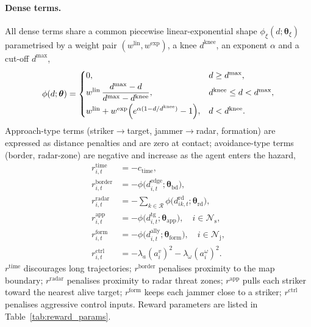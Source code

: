 \paragraph{Dense terms.}
All dense terms share a common piecewise linear-exponential shape
$\phi_\xi(d;\boldsymbol{\theta}_\xi)$ parametrised by a weight pair
$(w^{\mathrm{lin}},w^{\mathrm{exp}})$, a knee $d^{\mathrm{knee}}$, an exponent
$\alpha$ and a cut-off $d^{\max}$,
\begin{equation}
\phi(d;\boldsymbol{\theta}) =
\begin{cases}
0, & d\ge d^{\max},\\[2pt]
w^{\mathrm{lin}}\,\dfrac{d^{\max}-d}{d^{\max}-d^{\mathrm{knee}}}, &
d^{\mathrm{knee}}\le d < d^{\max},\\[6pt]
w^{\mathrm{lin}} + w^{\mathrm{exp}}\Bigl(e^{\alpha(1-d/d^{\mathrm{knee}})}-1\Bigr), &
d < d^{\mathrm{knee}}.
\end{cases}
\label{eq:phi}
\end{equation}
Approach-type terms (striker$\to$target, jammer$\to$radar, formation) are
expressed as distance penalties and are zero at contact; avoidance-type terms
(border, radar-zone) are negative and increase as the agent enters the
hazard,
\begin{align}
r^{\mathrm{time}}_{i,t}   &= -c_{\mathrm{time}}, \\
r^{\mathrm{border}}_{i,t} &= -\phi\bigl(d^{\mathrm{edge}}_{i,t};\boldsymbol{\theta}_{\mathrm{bd}}\bigr), \\
r^{\mathrm{radar}}_{i,t}  &= -\!\!\sum_{k\in\mathcal{R}}\phi\bigl(d^{\mathrm{rd}}_{ik,t};\boldsymbol{\theta}_{\mathrm{rd}}\bigr), \\
r^{\mathrm{app}}_{i,t}    &= -\phi\bigl(d^{\mathrm{tg}}_{i,t};\boldsymbol{\theta}_{\mathrm{app}}\bigr),
    \quad i\in\mathcal{N}_{\mathrm{s}}, \\
r^{\mathrm{form}}_{i,t}   &= -\phi\bigl(d^{\mathrm{ally}}_{i,t};\boldsymbol{\theta}_{\mathrm{form}}\bigr),
    \quad i\in\mathcal{N}_{\mathrm{j}}, \\
r^{\mathrm{ctrl}}_{i,t}   &= -\lambda_{a}(a_i^{v})^{2} - \lambda_{\omega}(a_i^{\omega})^{2}.
\end{align}
$r^{\mathrm{time}}$ discourages long trajectories; $r^{\mathrm{border}}$
penalises proximity to the map boundary; $r^{\mathrm{radar}}$ penalises
proximity to radar threat zones; $r^{\mathrm{app}}$ pulls each striker toward
the nearest alive target; $r^{\mathrm{form}}$ keeps each jammer close to a
striker; $r^{\mathrm{ctrl}}$ penalises aggressive control inputs. Reward
parameters are listed in Table~\ref{tab:reward_params}.

